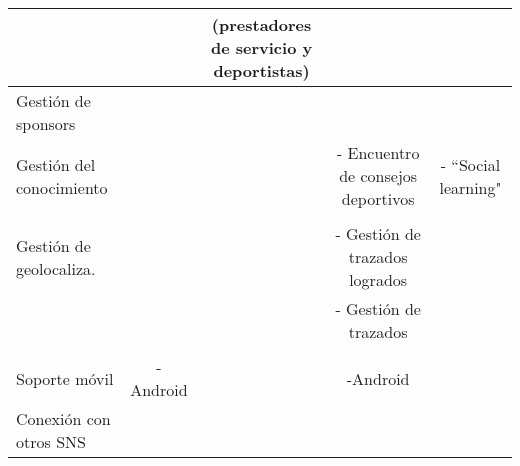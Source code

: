 \begin{landscape}
\begin{table}
\begin{center}
{\begin{tabular}{|l|llll|}
 & \multicolumn{1}{c}{} & \multicolumn{1}{c}{(prestadores de servicio y deportistas)} & \multicolumn{1}{c}{} & \multicolumn{1}{c|}{} \\ 
\hline
Gestión de sponsors & \multicolumn{1}{c}{} & \multicolumn{1}{c}{} & \multicolumn{1}{c}{} & \multicolumn{1}{c|}{} \\ 
\hline
Gestión del conocimiento & \multicolumn{1}{c}{} & \multicolumn{1}{c}{} & \multicolumn{1}{c}{- Encuentro de consejos deportivos} & \multicolumn{1}{c|}{- ``Social learning"} \\ 
 & \multicolumn{1}{c}{} & \multicolumn{1}{c}{} & \multicolumn{1}{c}{} & \multicolumn{1}{c|}{} \\ 
\hline
Gestión de geolocaliza. & \multicolumn{1}{c}{} & \multicolumn{1}{c}{} & \multicolumn{1}{c}{- Gestión de trazados logrados} & \multicolumn{1}{c|}{} \\ 
 & \multicolumn{1}{c}{} & \multicolumn{1}{c}{} & \multicolumn{1}{c}{- Gestión de trazados} & \multicolumn{1}{c|}{} \\ 
 & \multicolumn{1}{c}{} & \multicolumn{1}{c}{} & \multicolumn{1}{c}{} & \multicolumn{1}{c|}{} \\ 
\hline
Soporte móvil & \multicolumn{1}{c}{-Android} & \multicolumn{1}{c}{} & \multicolumn{1}{c}{-Android} & \multicolumn{1}{c|}{} \\ 
\hline
Conexión con otros SNS & \multicolumn{1}{c}{} & \multicolumn{1}{c}{} & \multicolumn{1}{c}{} & \multicolumn{1}{c|}{} \\ 
\hline
\end{tabular}
}
  
  \end{center}
\end{table}

\end{landscape}
